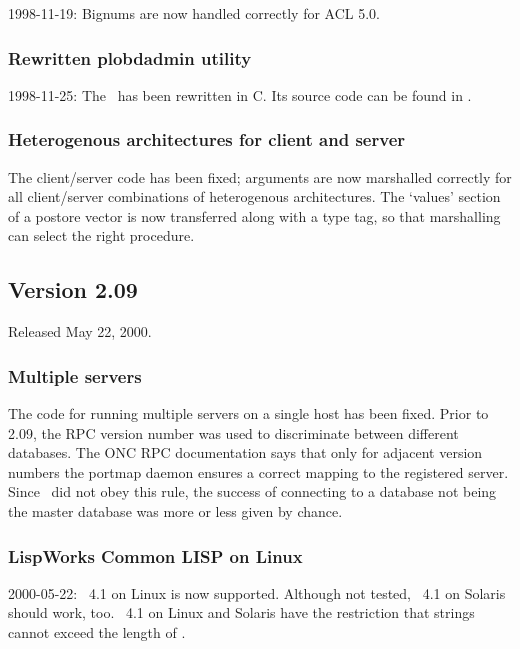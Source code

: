 1998-11-19: Bignums are now handled correctly for ACL 5.0.

\subsubsection{Rewritten plobdadmin utility}

1998-11-25: The \ has been rewritten in C. Its source
code can be found in .

\subsubsection{Heterogenous architectures for client and server}

The client/server code has been fixed; arguments are now marshalled
correctly for all client/server combinations of heterogenous
architectures. The `values' section of a postore vector is now
transferred along with a type tag, so that marshalling can select the
right procedure.

\subsection{Version 2.09}

Released May 22, 2000.

\subsubsection{Multiple servers}

The code for running multiple servers on a single host has been fixed.
Prior to 2.09, the RPC version number was used to discriminate between
different databases. The ONC RPC documentation says that only for
adjacent version numbers the portmap daemon ensures a correct mapping
to the registered server. Since \plob\ did not obey this rule, the
success of connecting to a database not being the master database
was more or less given by chance.

\subsubsection{LispWorks Common LISP on Linux}

2000-05-22: \lwcl\ 4.1 on Linux is now supported. Although not tested,
\lwcl\ 4.1 on Solaris should work, too. \lwcl\ 4.1 on Linux and
Solaris have the restriction that strings cannot exceed the length of
.

